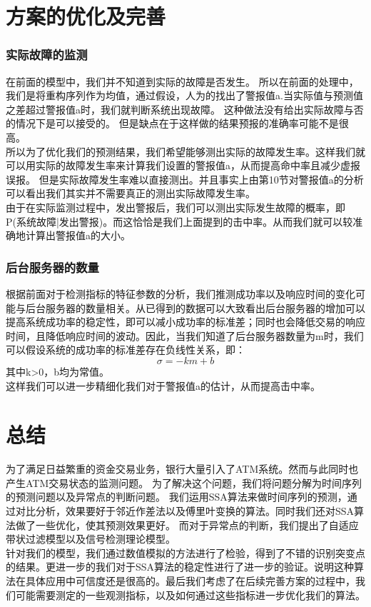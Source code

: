 \documentclass[a4paper]{article}
\begin{document}
\part{方案的优化及完善}
\section{实际故障的监测}
\indent 在前面的模型中，我们并不知道到实际的故障是否发生。
所以在前面的处理中，我们是将重构序列作为均值，通过假设，人为的找出了警报值a.当实际值与预测值之差超过警报值a时，我们就判断系统出现故障。
这种做法没有给出实际故障与否的情况下是可以接受的。
但是缺点在于这样做的结果预报的准确率可能不是很高。 \\
\indent 所以为了优化我们的预测结果，我们希望能够测出实际的故障发生率。这样我们就可以用实际的故障发生率来计算我们设置的警报值a，从而提高命中率且减少虚报误报。
但是实际故障发生率难以直接测出。并且事实上由第10节对警报值a的分析可以看出我们其实并不需要真正的测出实际故障发生率。\\
\indent 由于在实际监测过程中，发出警报后，我们可以测出实际发生故障的概率，即P(系统故障|发出警报)。而这恰恰是我们上面提到的击中率。从而我们就可以较准确地计算出警报值a的大小。
\section{后台服务器的数量}
\indent 根据前面对于检测指标的特征参数的分析，我们推测成功率以及响应时间的变化可能与后台服务器的数量相关。从已得到的数据可以大致看出后台服务器的增加可以提高系统成功率的稳定性，即可以减小成功率的标准差；同时也会降低交易的响应时间，且降低响应时间的波动。因此，当我们知道了后台服务器数量为m时，我们可以假设系统的成功率的标准差存在负线性关系，即：
\begin{equation}
\sigma=-km+b
\end{equation}
其中k>0，b均为常值。\\
这样我们可以进一步精细化我们对于警报值a的估计，从而提高击中率。	

\part{总结}
\indent 为了满足日益繁重的资金交易业务，银行大量引入了ATM系统。然而与此同时也产生ATM交易状态的监测问题。
为了解决这个问题，我们将问题分解为时间序列的预测问题以及异常点的判断问题。
我们运用SSA算法来做时间序列的预测，通过对比分析，效果要好于邻近作差法以及傅里叶变换的算法。同时我们还对SSA算法做了一些优化，使其预测效果更好。
而对于异常点的判断，我们提出了自适应带状过滤模型以及信号检测理论模型。\\
\indent 针对我们的模型，我们通过数值模拟的方法进行了检验，得到了不错的识别突变点的结果。更进一步的我们对于SSA算法的稳定性进行了进一步的验证。说明这种算法在具体应用中可信度还是很高的。最后我们考虑了在后续完善方案的过程中，我们可能需要测定的一些观测指标，以及如何通过这些指标进一步优化我们的算法。
\end{document}
